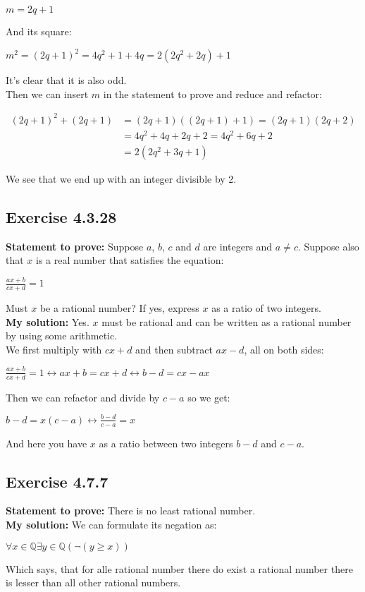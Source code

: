 \documentclass{article}
\newcommand{\cent}[1]{\begin{center}#1\end{center}}
\newcommand{\mAlign}[1]{\begin{align*}#1\end{align*}}
\newcommand{\doubleQ}{\mathbb{Q}}
\newcommand{\In}{\! \in \!}
\newcommand{\Prove}{\textbf{Statement to prove: }}
\newcommand{\Solution}{\textbf{My solution: }}
\newcommand{\QED}{\boxed{}}
\newcommand{\Exercise}[1]{\subsection{Exercise #1}}
\begin{document}
	\cent{$m = 2q + 1$}
	
	And its square:
	
	\cent{$m^2 = (2q+1)^2 = 4q^2+1+4q = 2(2q^2 + 2q) + 1$}
	
	It's clear that it is also odd.\\
	
	Then we can insert $m$ in the statement to prove and reduce and refactor:
	
	\mAlign{(2q+1)^2 + (2q+1) &= (2q+1)((2q+1) + 1) = (2q+1)(2q+2) \\
					&= 4q^2 +4q + 2q +2 = 4q^2 +6q + 2 \\
					&= 2(2q^2+3q + 1)}
				
	We see that we end up with an integer divisible by 2.\\
	\QED
	
	\Exercise{4.3.28}
	
	\Prove
	Suppose $a$, $b$, $c$ and $d$ are integers and $a \neq c$. Suppose also that $x$ is a real number that satisfies the equation:
	
	\cent{$\frac{ax+b}{cx+d} = 1$}
	
	Must $x$ be a rational number? If yes, express $x$ as a ratio of two integers.\\
	
	\Solution
	Yes. $x$ must be rational and can be written as a rational number by using some arithmetic.\\
	
	We first multiply with $cx+d$ and then subtract $ax - d$, all on both sides:
	 
	\cent{$\frac{ax+b}{cx+d} = 1 \leftrightarrow ax+b = cx+d \leftrightarrow b - d = cx - ax$}
	
	Then we can refactor and divide by $c-a$ so we get:
	
	\cent{$b -d = x(c-a) \leftrightarrow \frac{b-d}{c-a} = x$}
	
	And here you have $x$ as a ratio between two integers $b-d$ and $c-a$.\\
	\QED
	
	\Exercise{4.7.7}
	
	\Prove
	There is no least rational number.\\
	
	\Solution
	We can formulate its negation as:
	
	\cent{$\forall x \In \doubleQ \exists y \in \doubleQ(\neg(y \geq x))$}
	
	Which says, that for alle rational number there do exist a rational number there is lesser than all other rational numbers.\\
	
\end{document}
